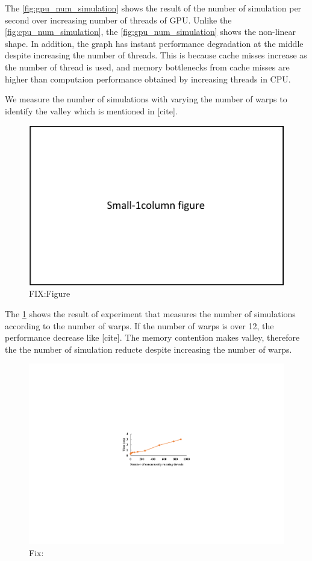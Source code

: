 \documentclass[conference]{IEEEtran}
\begin{document}
The \cref{fig:gpu_num_simulation} shows the result of the number of simulation per second over increasing number of threads of GPU. 
Unlike the \cref{fig:cpu_num_simulation}, the \cref{fig:gpu_num_simulation} shows the non-linear shape. 
In addition, the graph has instant performance degradation at the middle despite increasing the number of threads. 
This is because cache misses increase as the number of thread is used, and memory bottlenecks from cache misses are higher than computaion performance obtained by increasing threads in CPU.

We measure the number of simulations with varying the number of warps to identify the valley which is mentioned in [cite]. 
\begin{figure}
\includegraphics{figures/fit_1col.pdf}
\caption{FIX:Figure}
\label{fig:gpu_warp_simulation}
\end{figure}

The \cref{fig:gpu_warp_simulation} shows the result of experiment that measures the number of simulations according to the number of warps. 
If the number of warps is over 12, the performance decrease like [cite]. 
The memory contention makes valley, therefore the the number of simulation reducte despite increasing the number of warps. 

\begin{figure}
\includegraphics{figures/gpu_thread_time.pdf}
\caption{Fix: }
\label{fig:gpu_thread_time}
\end{figure}
\end{document}
